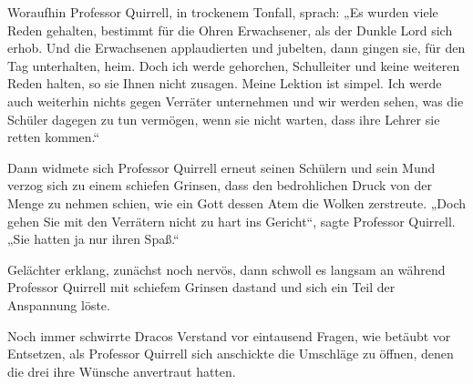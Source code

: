 Woraufhin Professor Quirrell, in trockenem Tonfall, sprach: „Es wurden viele Reden gehalten, bestimmt für die Ohren Erwachsener, als der Dunkle Lord sich erhob. Und die Erwachsenen applaudierten und jubelten, dann gingen sie, für den Tag unterhalten, heim. Doch ich werde gehorchen, Schulleiter und keine weiteren Reden halten, so sie Ihnen nicht zusagen. Meine Lektion ist simpel. Ich werde auch weiterhin nichts gegen Verräter unternehmen und wir werden sehen, was die Schüler dagegen zu tun vermögen, wenn sie nicht warten, dass ihre Lehrer sie retten kommen.“

Dann widmete sich Professor Quirrell erneut seinen Schülern und sein Mund verzog sich zu einem schiefen Grinsen, dass den bedrohlichen Druck von der Menge zu nehmen schien, wie ein Gott dessen Atem die Wolken zerstreute. „Doch gehen Sie mit den Verrätern nicht zu hart ins Gericht“, sagte Professor Quirrell. „Sie hatten ja nur ihren Spaß.“

Gelächter erklang, zunächst noch nervös, dann schwoll es langsam an während Professor Quirrell mit schiefem Grinsen dastand und sich ein Teil der Anspannung löste.

\later

Noch immer schwirrte Dracos Verstand vor eintausend Fragen, wie betäubt vor Entsetzen, als Professor Quirrell sich anschickte die Umschläge zu öffnen, denen die drei ihre Wünsche anvertraut hatten.

